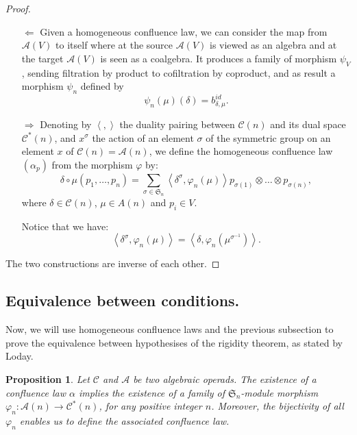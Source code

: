 \documentclass[11pt,leqno]{amsart}
\theoremstyle{definition}
\theoremstyle{plain}
\newtheorem{proposition}[definition]{Proposition}
\newcommand{\A}{ \mathcal{A} }
\newcommand{\C}{ \mathcal{C} }
\begin{document}
\begin{proof}
\begin{itemize}
\item[$\Leftarrow$] Given a homogeneous confluence law, we can consider the map from $\A(V)$ to itself where at the source $\A(V)$ is viewed as an algebra and at the target $\A(V)$ is seen as a coalgebra. It produces  a family of morphism $\psi_V$, sending filtration by product to cofiltration by coproduct, and as result a morphism $\psi_n$ defined by 
\begin{equation*}
\psi_n (\mu) (\delta)= b^{id}_{\delta, \mu}. 
\end{equation*} 
\item[$\Rightarrow$]Denoting by $\left\langle , \right\rangle$ the duality pairing between $\C(n)$ and its dual space $\C^*(n)$, and $x^{\sigma}$ the action of an element $\sigma$ of the symmetric group on an element $x$ of $\C(n)=\A(n)$, we define the homogeneous confluence law $(\alpha_p)$ from the morphism $\varphi$ by:
\begin{equation} \label{crochet}
\delta \circ \mu (p_1, \ldots, p_n) = \sum_{\sigma \in \mathfrak{S}_n}\left\langle  \delta^{\sigma}, \varphi_n(\mu)\right\rangle p_{\sigma(1)} \otimes \ldots \otimes p_{\sigma(n)},
\end{equation} 
where $\delta \in \C(n)$, $\mu \in A(n)$ and $p_i \in V$.

Notice that we have: 
\begin{equation*}
\left\langle   \delta^{\sigma}, \varphi_n(\mu)\right\rangle = \left\langle  \delta, \varphi_n(   \mu^{\sigma^{-1}})\right\rangle.
\end{equation*}
\end{itemize}




The two constructions are inverse of each other.

\end{proof}




\subsection{Equivalence between conditions.} 
\label{Equiv}

Now, we will use homogeneous confluence laws and the previous subsection to prove the equivalence between hypothesises of the rigidity theorem, as stated by Loday.


\begin{proposition}\label{mdl}
Let $\mathcal C$ and $\mathcal A$ be two algebraic operads.
The existence of a confluence law $\alpha$  implies the existence of a family of $\mathfrak{S}_n$-module morphism $\varphi_n:\A(n)\to \C^*(n)$, for any positive integer $n$. Moreover, the bijectivity of all $\varphi_n$ enables us to define the associated confluence law.
\end{proposition}
\end{document}
